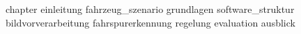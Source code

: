 {chapter}
{einleitung}
{fahrzeug_szenario}
{grundlagen}
{software_struktur}
{bildvorverarbeitung}
{fahrspurerkennung}
{regelung}
{evaluation}
{ausblick}
